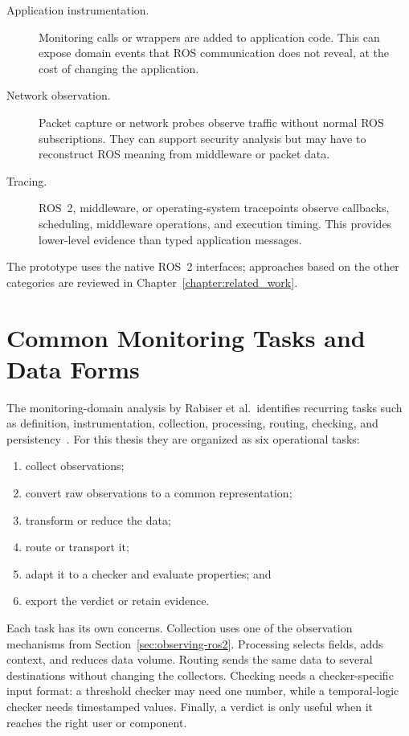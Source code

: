 \begin{description}
  \item[Application instrumentation.] Monitoring calls or wrappers are added to
  application code. This can expose domain events that ROS communication does
  not reveal, at the cost of changing the application.

  \item[Network observation.] Packet capture or network probes observe traffic
  without normal ROS subscriptions. They can support security analysis but may
  have to reconstruct ROS meaning from middleware or packet data.

  \item[Tracing.] ROS~2, middleware, or operating-system tracepoints observe
  callbacks, scheduling, middleware operations, and execution timing. This
  provides lower-level evidence than typed application messages.
\end{description}

The prototype uses the native ROS~2 interfaces; approaches based on the other
categories are reviewed in Chapter~\ref{chapter:related_work}.

\section{Common Monitoring Tasks and Data Forms}

The monitoring-domain analysis by Rabiser et al.\ identifies recurring tasks
such as definition, instrumentation, collection, processing, routing, checking,
and persistency~\cite{rabiser2019domain}. For this thesis they are organized as
six operational tasks:

\begin{enumerate}
  \item collect observations;
  \item convert raw observations to a common representation;
  \item transform or reduce the data;
  \item route or transport it;
  \item adapt it to a checker and evaluate properties; and
  \item export the verdict or retain evidence.
\end{enumerate}

Each task has its own concerns. Collection uses one of the observation
mechanisms from Section~\ref{sec:observing-ros2}. Processing selects fields,
adds context, and reduces data volume. Routing sends the same data to several
destinations without changing the collectors. Checking needs a
checker-specific input format: a threshold checker may need one number, while
a temporal-logic checker needs timestamped values. Finally, a verdict is only
useful when it reaches the right user or component.

